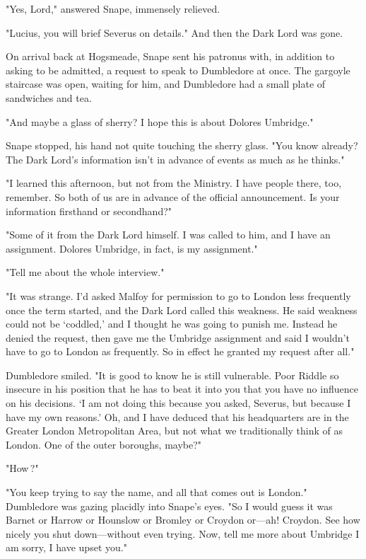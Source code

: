 "Yes, Lord," answered Snape, immensely relieved.

"Lucius, you will brief Severus on details." And then the Dark Lord was gone.

\sbreak

On arrival back at Hogsmeade, Snape sent his patronus with, in addition to asking to be admitted, a request to speak to Dumbledore at once. The gargoyle staircase was open, waiting for him, and Dumbledore had a small plate of sandwiches and tea.

"And maybe a glass of sherry? I hope this is about Dolores Umbridge."

Snape stopped, his hand not quite touching the sherry glass. "You know already? The Dark Lord's information isn't in advance of events as much as he thinks."

"I learned this afternoon, but not from the Ministry. I have people there, too, remember. So both of us are in advance of the official announcement. Is your information firsthand or secondhand?"

"Some of it from the Dark Lord himself. I was called to him, and I have an assignment. Dolores Umbridge, in fact, is my assignment."

"Tell me about the whole interview."

"It was strange. I'd asked Malfoy for permission to go to{\el} London less frequently once the term started, and the Dark Lord called this weakness. He said weakness could not be `coddled,' and I thought he was going to punish me. Instead he denied the request, then gave me the Umbridge assignment and said I wouldn't have to go to{\el} London as frequently. So in effect he granted my request after all."

Dumbledore smiled. "It is good to know he is still vulnerable. Poor Riddle{\el} so insecure in his position that he has to beat it into you that you have no influence on his decisions. `I am not doing this because you asked, Severus, but because I have my own reasons.' Oh, and I have deduced that his headquarters are in the Greater London Metropolitan Area, but not what we traditionally think of as London. One of the outer boroughs, maybe?"

"How{\el}\,?"

"You keep trying to say the name, and all that comes out is London." Dumbledore was gazing placidly into Snape's eyes. "So I would guess it was Barnet{\el} or Harrow{\el} or Hounslow{\el} or Bromley{\el} or Croydon{\el} or—ah! Croydon. See how nicely you shut down—without even trying. Now, tell me more about Umbridge{\el} I am sorry, I have upset you."

